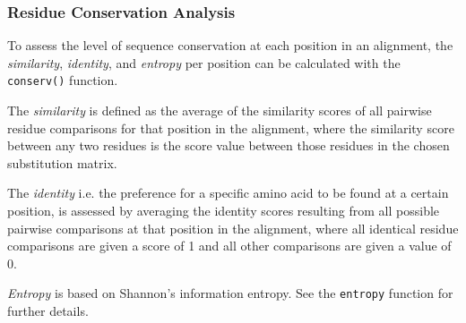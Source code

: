 \documentclass[a4paper]{article}
\begin{document}
\subsubsection{Residue Conservation Analysis}
To assess the level of sequence conservation at each position in
an alignment, the \emph{similarity}, \emph{identity}, and \emph{entropy} per position can be calculated with the \texttt{conserv()} function.

The \emph{similarity} is defined as the average of the similarity
scores of all pairwise residue comparisons for that position in
the alignment, where the similarity score between any two residues
is the score value between those residues in the chosen
substitution matrix.

The \emph{identity} i.e. the preference for a specific amino acid to be
found at a certain position, is assessed by averaging the identity
scores resulting from all possible pairwise comparisons at that
position in the alignment, where all identical residue comparisons
are given a score of 1 and all other comparisons are given a value
of 0.

\emph{Entropy} is based on Shannon's information entropy. See the
\texttt{entropy} function for further details.

\begin{Schunk}
\end{Schunk}
\end{document}
